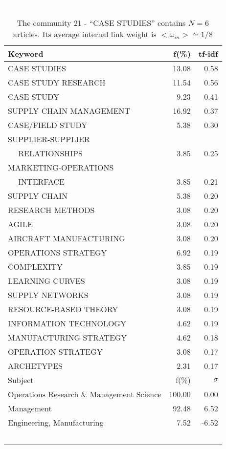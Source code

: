 \documentclass[a4paper,11pt]{report}
\begin{document}
\begin{landscape}
\begin{table}[!ht]
\caption{The community 21 - ``CASE STUDIES'' contains $N = 6$ articles. Its average internal link weight is $<\omega_{in}> \simeq 1/8$ }
\textcolor{white}{aa}\\
{\scriptsize\begin{tabular}{|l r  r|}
\hline
Keyword & f(\%) & tf-idf \\
\hline
CASE STUDIES & 13.08 & 0.58\\
CASE STUDY RESEARCH & 11.54 & 0.56\\
CASE STUDY & 9.23 & 0.41\\
SUPPLY CHAIN MANAGEMENT & 16.92 & 0.37\\
CASE/FIELD STUDY & 5.38 & 0.30\\
SUPPLIER-SUPPLIER &  &\\
$\quad$ RELATIONSHIPS & 3.85 & 0.25\\
MARKETING-OPERATIONS &  &\\
$\quad$ INTERFACE & 3.85 & 0.21\\
SUPPLY CHAIN & 5.38 & 0.20\\
RESEARCH METHODS & 3.08 & 0.20\\
AGILE & 3.08 & 0.20\\
AIRCRAFT MANUFACTURING & 3.08 & 0.20\\
OPERATIONS STRATEGY & 6.92 & 0.19\\
COMPLEXITY & 3.85 & 0.19\\
LEARNING CURVES & 3.08 & 0.19\\
SUPPLY NETWORKS & 3.08 & 0.19\\
RESOURCE-BASED THEORY & 3.08 & 0.19\\
INFORMATION TECHNOLOGY & 4.62 & 0.19\\
MANUFACTURING STRATEGY & 4.62 & 0.18\\
OPERATION STRATEGY & 3.08 & 0.17\\
ARCHETYPES & 2.31 & 0.17\\
\hline
\hline
Subject & f(\%) & $\sigma$\\
\hline
Operations Research \& Management Science & 100.00 & 0.00\\
Management & 92.48 & 6.52\\
Engineering, Manufacturing & 7.52 & -6.52\\
 &  & \\
 &  & \\
 &  & \\
 &  & \\
 &  & \\

\end{tabular}}
\end{table}
\end{landscape}
\end{document}
